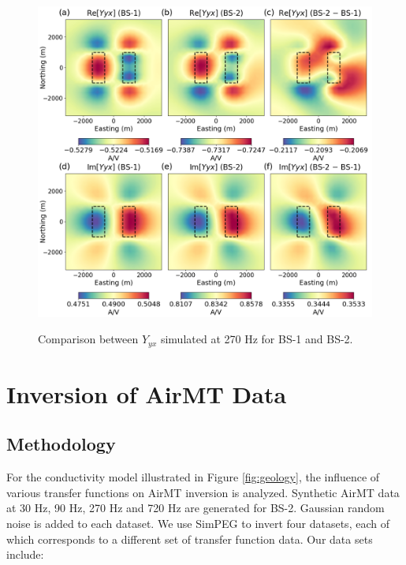 \documentclass{segabs}
\begin{document}
\begin{figure}
\includegraphics[width=\columnwidth]{images/anomalies_admittance.png}
\label{fig:admittance_anomalies}
\vspace{-20pt}
\caption{Comparison between $Y_{yx}$ simulated at 270 Hz for BS-1 and BS-2.}
\vspace{-10pt}
\end{figure}

\vspace{-15pt}
\section{Inversion of AirMT Data}
\vspace{-5pt}
\subsection{Methodology}

For the conductivity model illustrated in Figure \ref{fig:geology}, the influence of various transfer functions on AirMT inversion is analyzed. Synthetic AirMT data at 30 Hz, 90 Hz, 270 Hz and 720 Hz are generated for BS-2. Gaussian random noise is added to each dataset. We use SimPEG \citep{Cockett2015} to invert four datasets, each of which corresponds to a different set of transfer function data. Our data sets include:
\end{document}
